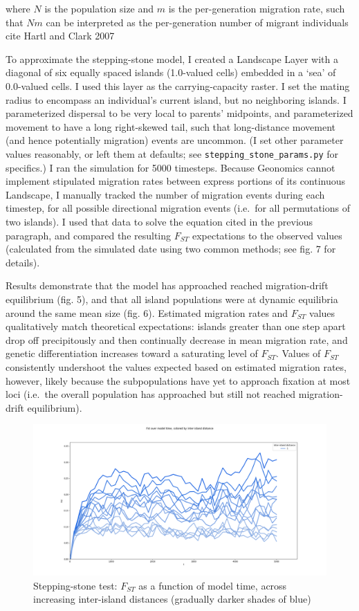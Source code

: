 ﻿\documentclass{article}
\begin{document}
where $N$ is the population size and $m$ is the per-generation migration rate,
such that $Nm$ can be interpreted as the per-generation number of migrant
individuals {\large cite  Hartl and Clark 2007}

To approximate the stepping-stone model, I created a Landscape Layer with
a diagonal of six equally spaced islands (1.0-valued cells) embedded in 
a `sea' of 0.0-valued cells. I used this layer as the carrying-capacity raster. I set the
mating radius to encompass an individual's current island, but no neighboring islands. I
parameterized dispersal to be very local to parents' midpoints, and
parameterized movement to have a long right-skewed tail, such that long-distance movement
(and hence potentially migration) events are uncommon.
(I set other parameter values reasonably, or left them at defaults; see 
\texttt{stepping\_stone\_params.py} for specifics.) I ran the simulation for 5000 timesteps.
Because Geonomics cannot implement stipulated migration rates between
express portions of its continuous Landscape, I manually tracked the number of
migration events during each timestep, for all possible directional migration events 
(i.e.\ for all permutations of two islands). I used that data to solve the equation cited in the previous paragraph, and compared the resulting $F_{ST}$ expectations to the observed
values (calculated from the simulated date using two common methods;
see fig. 7 for details).

Results demonstrate that the model has approached reached migration-drift equilibrium
(fig. 5), and that all island populations were at dynamic equilibria around the
same mean size (fig. 6). Estimated migration rates and $F_{ST}$ values qualitatively
match theoretical expectations: islands greater than one step apart drop off 
precipitously and then continually decrease in mean migration rate,
and genetic differentiation increases toward a saturating level of $F_{ST}$.
Values of $F_{ST}$ consistently undershoot the values expected based on estimated
migration rates, however, likely because the subpopulations have yet to approach fixation
at most loci (i.e.\ the overall population has approached but still not reached
migration-drift equilibrium).

\begin{figure}[h!]
\includegraphics[width=175mm]{./img/validation/stepping_stone/Fst_over_time_vs_interisland_dist.png}
        \caption{Stepping-stone test: $F_{ST}$ as a function of model time, across increasing inter-island distances (gradually darker shades of blue)}
\end{figure}
\end{document}
